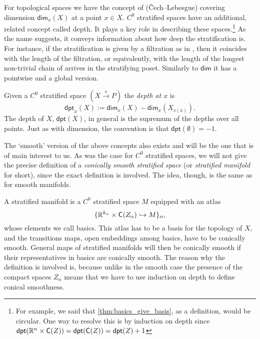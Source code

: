 \documentclass[../text]{subfiles}
\begin{document}
For topological spaces we have the concept of (\v{C}ech--Lebesgue) covering dimension $\mathsf{dim}_x (X)$ at a point $x \in X$. $C^0$ stratified spaces have an additional, related concept called depth. It plays a key role in describing these spaces.\footnote{For example, we said that \cref{thm:basics_give_basis}, as a definition, would be circular. One way to resolve this is by induction on depth since $\mathsf{dpt} (\mathbb{R}^n \times \cone(Z)) = \mathsf{dpt} (\cone(Z)) = \mathsf{dpt} (Z) + 1$} As the name suggests, it conveys information about how deep the stratification is. For instance, if the stratification is given by a filtration as in , then it coincides with the length of the filtration, or equivalently, with the length of the longest non-trivial chain of arrives in the stratifying poset. Similarly to $\mathsf{dim}$ it has a pointwise and a global version.

\begin{definition}
    Given a $C^0$ stratified space $(X \xrightarrow{s} P)$ the \emph{depth at $x$} is
    \begin{equation}
        \mathsf{dpt}_x (X) := \mathsf{dim}_x (X) - \mathsf{dim}_x (X_{s(x)}).
    \end{equation}
    The depth of $X$, $\mathsf{dpt} (X)$, in general is the supremum of the depths over all points. Just as with dimension, the convention is that $\mathsf{dpt}(\emptyset) = -1$.
\end{definition}

The `smooth' version of the above concepts also exists and will be the one that is of main interest to us. As was the case for $C^0$ stratified spaces, we will not give the precise definition of a \emph{conically smooth stratified space} (or \emph{stratified manifold} for short), since the exact definition is involved. The idea, though, is the same as for smooth manifolds.

A stratified manifold is a $C^0$ stratified space $M$ equipped with an atlas
%
\begin{equation}
    \{\mathbb{R}^{k_\alpha} \times \cone(Z_\alpha) \hookrightarrow M\}_\alpha,
\end{equation}
%
whose elements we call basics. This atlas has to be a basis for the topology of $X$, and the transitions maps, open embeddings among basics, have to be conically smooth. General maps of stratified manifolds will then be conically smooth if their representatives in basics are conically smooth.
The reason why the definition is involved is, because unlike in the smooth case the presence of the compact spaces $Z_\alpha$ means that we have to use induction on depth to define conical smoothness.
\end{document}
